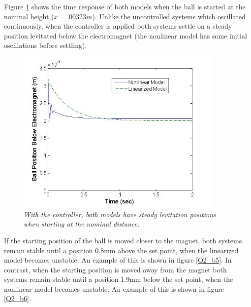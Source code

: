 \documentclass{article}
\theoremstyle{plain}
\theoremstyle{definition}
\theoremstyle{remark}
\begin{document}
Figure \ref{Q2_b4} shows the time response of both models when the ball is started at the nominal height ($\bar{x} = .00323m$). Unlike the uncontrolled systems which oscillated continuously, when the controller is applied both systems settle on a steady position levitated below the electromagnet (the nonlinear model has some initial oscillations before settling).\\

\begin{figure}[h!]
\begin{center}
\includegraphics[width = 10cm]{Part2bNoDisturbance}
\caption{\emph{With the controller, both models have steady levitation positions when starting at the nominal distance.}}
\label{Q2_b4}
\end{center}
\end{figure}

If the starting position of the ball is moved closer to the magnet, both systems remain stable until a position 0.8mm above the set point, when the linearized model becomes unstable. An example of this is shown in figure \ref{Q2_b5}. In contrast, when the starting position is moved away from the magnet both systems remain stable until a position 1.9mm below the set point, when the nonlinear model becomes unstable. An example of this is shown in figure \ref{Q2_b6}.\\
\end{document}
